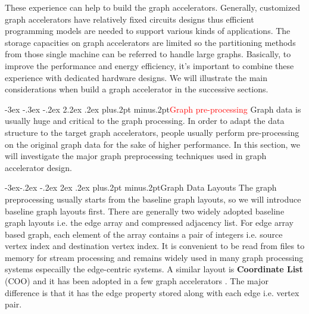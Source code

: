 \documentclass[twoside]{article}
\makeatletter
\def\section{\@startsection{section}{1}{\z@}%
 {-3ex \@plus -.3ex \@minus -.2ex}%
 {2.2ex \@plus.2ex}%
{\normalfont\normalsize\protect\baselineskip=14.5pt plus.2pt minus.2pt\bfseries}}
\def\subsection{\@startsection{subsection}{2}{\z@}%
 {-3ex\@plus -.2ex \@minus -.2ex}%
 {2ex \@plus.2ex}%
{\normalfont\normalsize\protect\baselineskip=12.5pt plus.2pt minus.2pt\bfseries}}
\makeatother
\begin{document}
\begin{multicols}{2}
These experience can help to build the graph accelerators. Generally, customized graph accelerators have relatively fixed circuits designs thus efficient programming models are needed to support various kinds of applications. The storage capacities on graph accelerators are limited so the partitioning methods from those single machine can be referred to handle large graphs. Basically, to improve the performance and energy efficiency, it's important to combine these experience with dedicated hardware designs. We will illustrate the main considerations when build a graph accelerator in the successive sections.


\section{\textcolor{red}{Graph pre-processing}}
Graph data is usually huge and critical to the graph processing. In order to adapt the data structure to the target graph accelerators, people usually perform pre-processing on the original graph data for the sake of higher performance. In this section, we will investigate the major graph preprocessing techniques used in graph accelerator design. 

\subsection{Graph Data Layouts}
The graph preprocessing usually starts from the baseline graph layouts, so we will introduce 
baseline graph layouts first. There are generally 
two widely adopted baseline graph layouts i.e. the edge array and compressed 
adjacency list. For edge array based graph, each element of the array contains 
a pair of integers i.e. source vertex index and destination vertex index. 
It is convenient to be read from files to memory for stream processing 
and remains widely used in many graph processing systems especailly 
the edge-centric systems. A similar layout is {\bf Coordinate List} (COO) 
and it has been adopted in a few graph accelerators 
\cite{song2018graphr,zhou2016highthroughput,Dai2017foregraph}. 
The major difference is that it has the edge property stored 
along with each edge i.e. vertex pair.  


\end{multicols}
\end{document}
